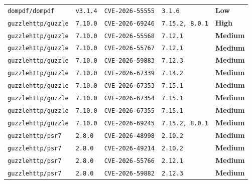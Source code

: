\documentclass[11pt,a4paper]{article}
\newcommand{\sevbadge}[1]{\textbf{\textcolor{sev#1}{#1}}}
\begin{document}
{\begin{longtable}{@{}>{\raggedright\arraybackslash}p{} l >{\raggedright\arraybackslash}p{} l l@{}}
\texttt{\small dompdf/\allowbreak{}dompdf} & \texttt{\small v3.1.4} & \texttt{\small CVE-2026-55555} & \texttt{\small 3.1.6} & \sevbadge{Low}\\
\texttt{\small guzzlehttp/\allowbreak{}guzzle} & \texttt{\small 7.10.0} & \texttt{\small CVE-2026-69246} & \texttt{\small 7.15.2, 8.0.1} & \sevbadge{High}\\
\texttt{\small guzzlehttp/\allowbreak{}guzzle} & \texttt{\small 7.10.0} & \texttt{\small CVE-2026-55568} & \texttt{\small 7.12.1} & \sevbadge{Medium}\\
\texttt{\small guzzlehttp/\allowbreak{}guzzle} & \texttt{\small 7.10.0} & \texttt{\small CVE-2026-55767} & \texttt{\small 7.12.1} & \sevbadge{Medium}\\
\texttt{\small guzzlehttp/\allowbreak{}guzzle} & \texttt{\small 7.10.0} & \texttt{\small CVE-2026-59883} & \texttt{\small 7.12.3} & \sevbadge{Medium}\\
\texttt{\small guzzlehttp/\allowbreak{}guzzle} & \texttt{\small 7.10.0} & \texttt{\small CVE-2026-67339} & \texttt{\small 7.14.2} & \sevbadge{Medium}\\
\texttt{\small guzzlehttp/\allowbreak{}guzzle} & \texttt{\small 7.10.0} & \texttt{\small CVE-2026-67353} & \texttt{\small 7.15.1} & \sevbadge{Medium}\\
\texttt{\small guzzlehttp/\allowbreak{}guzzle} & \texttt{\small 7.10.0} & \texttt{\small CVE-2026-67354} & \texttt{\small 7.15.1} & \sevbadge{Medium}\\
\texttt{\small guzzlehttp/\allowbreak{}guzzle} & \texttt{\small 7.10.0} & \texttt{\small CVE-2026-67355} & \texttt{\small 7.15.1} & \sevbadge{Medium}\\
\texttt{\small guzzlehttp/\allowbreak{}guzzle} & \texttt{\small 7.10.0} & \texttt{\small CVE-2026-69245} & \texttt{\small 7.15.2, 8.0.1} & \sevbadge{Medium}\\
\texttt{\small guzzlehttp/\allowbreak{}psr7} & \texttt{\small 2.8.0} & \texttt{\small CVE-2026-48998} & \texttt{\small 2.10.2} & \sevbadge{Medium}\\
\texttt{\small guzzlehttp/\allowbreak{}psr7} & \texttt{\small 2.8.0} & \texttt{\small CVE-2026-49214} & \texttt{\small 2.10.2} & \sevbadge{Medium}\\
\texttt{\small guzzlehttp/\allowbreak{}psr7} & \texttt{\small 2.8.0} & \texttt{\small CVE-2026-55766} & \texttt{\small 2.12.1} & \sevbadge{Medium}\\
\texttt{\small guzzlehttp/\allowbreak{}psr7} & \texttt{\small 2.8.0} & \texttt{\small CVE-2026-59882} & \texttt{\small 2.12.3} & \sevbadge{Medium}\\

\end{longtable}}
\end{document}
